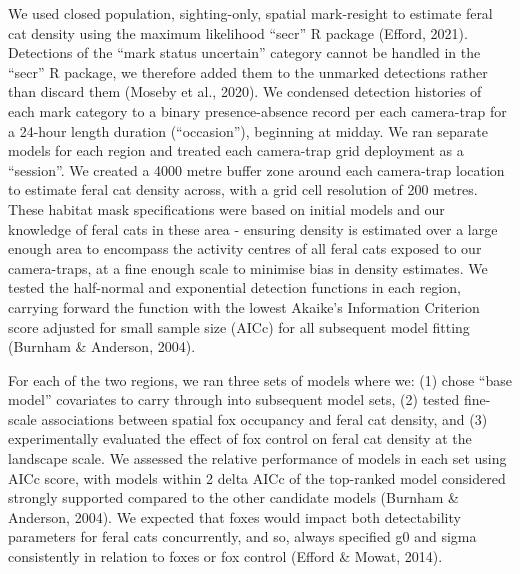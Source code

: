 \documentclass[]{elsarticle} %
\begin{document}
We used closed population, sighting-only, spatial mark-resight to estimate feral cat density using the maximum likelihood ``secr'' R package (Efford, 2021). Detections of the ``mark status uncertain'' category cannot be handled in the ``secr'' R package, we therefore added them to the unmarked detections rather than discard them (Moseby et al., 2020). We condensed detection histories of each mark category to a binary presence-absence record per each camera-trap for a 24-hour length duration (``occasion''), beginning at midday. We ran separate models for each region and treated each camera-trap grid deployment as a ``session''. We created a 4000 metre buffer zone around each camera-trap location to estimate feral cat density across, with a grid cell resolution of 200 metres. These habitat mask specifications were based on initial models and our knowledge of feral cats in these area - ensuring density is estimated over a large enough area to encompass the activity centres of all feral cats exposed to our camera-traps, at a fine enough scale to minimise bias in density estimates. We tested the half-normal and exponential detection functions in each region, carrying forward the function with the lowest Akaike's Information Criterion score adjusted for small sample size (AICc) for all subsequent model fitting (Burnham \& Anderson, 2004).

For each of the two regions, we ran three sets of models where we: (1) chose ``base model'' covariates to carry through into subsequent model sets, (2) tested fine-scale associations between spatial fox occupancy and feral cat density, and (3) experimentally evaluated the effect of fox control on feral cat density at the landscape scale. We assessed the relative performance of models in each set using AICc score, with models within 2 delta AICc of the top-ranked model considered strongly supported compared to the other candidate models (Burnham \& Anderson, 2004). We expected that foxes would impact both detectability parameters for feral cats concurrently, and so, always specified g0 and sigma consistently in relation to foxes or fox control (Efford \& Mowat, 2014).
\end{document}
